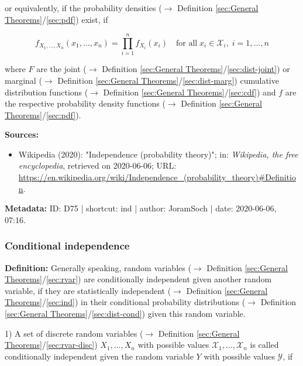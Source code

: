 \documentclass[a4paper,12pt,twoside]{book}
\begin{document}
or equivalently, if the probability densities ($\rightarrow$ Definition \ref{sec:General Theorems}/\ref{sec:pdf}) exist, if

\begin{equation} \label{eq:ind-cont-ind-f}
f_{X_1,\ldots,X_n}(x_1,\ldots,x_n) = \prod_{i=1}^{n} f_{X_i}(x_i) \quad \text{for all} \; x_i \in \mathcal{X}_i, \; i = 1, \ldots, n
\end{equation}

where $F$ are the joint ($\rightarrow$ Definition \ref{sec:General Theorems}/\ref{sec:dist-joint}) or marginal ($\rightarrow$ Definition \ref{sec:General Theorems}/\ref{sec:dist-marg}) cumulative distribution functions ($\rightarrow$ Definition \ref{sec:General Theorems}/\ref{sec:cdf}) and $f$ are the respective probability density functions ($\rightarrow$ Definition \ref{sec:General Theorems}/\ref{sec:pdf}).


\vspace{1em}
\textbf{Sources:}
\begin{itemize}
\item Wikipedia (2020): "Independence (probability theory)"; in: \textit{Wikipedia, the free encyclopedia}, retrieved on 2020-06-06; URL: \url{https://en.wikipedia.org/wiki/Independence_(probability_theory)#Definition}.
\end{itemize}


\vspace{1em}
\textbf{Metadata:} ID: D75 | shortcut: ind | author: JoramSoch | date: 2020-06-06, 07:16.
\vspace{1em}



\subsubsection[\textit{Conditional independence}]{Conditional independence} \label{sec:ind-cond}
\setcounter{equation}{0}

\textbf{Definition:} Generally speaking, random variables ($\rightarrow$ Definition \ref{sec:General Theorems}/\ref{sec:rvar}) are conditionally independent given another random variable, if they are statistically independent ($\rightarrow$ Definition \ref{sec:General Theorems}/\ref{sec:ind}) in their conditional probability distributions ($\rightarrow$ Definition \ref{sec:General Theorems}/\ref{sec:dist-cond}) given this random variable.

\vspace{1em}
1) A set of discrete random variables ($\rightarrow$ Definition \ref{sec:General Theorems}/\ref{sec:rvar-disc}) $X_1, \ldots, X_n$ with possible values $\mathcal{X}_1, \ldots, \mathcal{X}_n$ is called conditionally independent given the random variable $Y$ with possible values $\mathcal{Y}$, if
\end{document}
